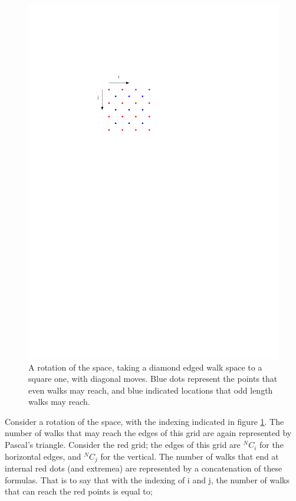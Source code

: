 	\begin{figure}
	\centering
	\includegraphics{figs/grid2.pdf}
	\caption{A rotation of the space, taking a diamond edged walk space to a square one, with diagonal moves. Blue dots represent the points that even walks may reach, and blue indicated locations that odd length walks may reach.}
	\label{fig:cogrid}
	\end{figure}
	Consider a rotation of the space, with the indexing indicated in figure \ref{fig:cogrid}. The number of walks that may reach the edges of this grid are again represented by Pascal's triangle. Consider the red grid; the edges of this grid are ${}^NC_i$ for the horizontal edges, and ${}^NC_j$ for the vertical. The number of walks that end at internal red dots (and extremea) are represented by a concatenation of these formulas. That is to say that with the indexing of i and j, the number of walks that can reach the red points is equal to;
